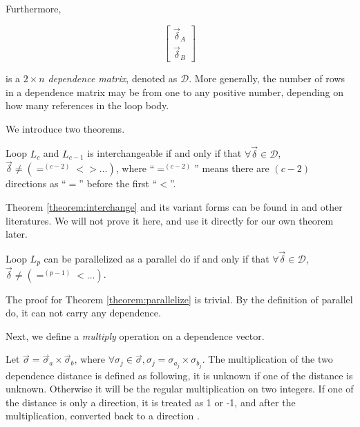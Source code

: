 Furthermore,

\begin{displaymath}
\left[ 
\begin{array}{c}
\vec{\delta}_{A} \\
\vec{\delta}_{B}
\end{array}
\right]
\end{displaymath}

is a $2 \times n$ \emph{dependence matrix}, denoted as $\mathcal{D}$.
More generally, the number of rows in a dependence matrix may be from
one to any positive number, depending on how many references in the
loop body.

We introduce two theorems.

\begin{theorem} \label{theorem:interchange}
  Loop $L_{c}$ and $L_{c-1}$ is interchangeable if and only if that
  $\forall \vec{\delta} \in \mathcal{D}$, $\vec{\delta} \neq
  (=^{(c-2)} < > \ldots)$, where ``$=^{(c-2)}$'' means there are
  $(c-2)$ directions as ``$=$'' before the first ``$<$''.
\end{theorem} 

Theorem \ref{theorem:interchange} and its variant forms can be found
in \cite{Zim90} and other literatures. We will not prove it here, and
use it directly for our own theorem later.

\begin{theorem} \label{theorem:parallelize}
  Loop $L_{p}$ can be parallelized as a parallel do if and only if
  that $\forall \vec{\delta} \in \mathcal{D}$, $\vec{\delta} \neq
  (=^{(p-1)} < \ldots)$.
\end{theorem} 

The proof for Theorem \ref{theorem:parallelize} is trivial. By the
definition of parallel do, it can not carry any dependence.

Next, we define a \emph{multiply} operation on a dependence vector.

Let $ \vec\sigma=\vec{\sigma}_{a} \times \vec{\sigma}_{b}$, where
$\forall \sigma_{j} \in \vec\sigma, \sigma_{j} = \sigma_{a_{j}} \times
\sigma_{b_{j}}$. The multiplication of the two dependence distance is
defined as following, it is unknown if one of the distance is unknown.
Otherwise it will be the regular multiplication on two integers. If
one of the distance is only a direction, it is treated as 1 or -1, and
after the multiplication, converted back to a direction .

